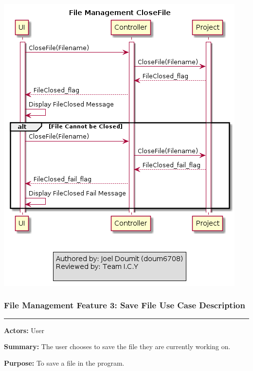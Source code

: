 \documentclass[twoside,letterpaper]{article}
\begin{document}
\includegraphics[width=\textwidth]{images/SequenceDiagrams/FM_FileClose_Image}

\newpage

\subsubsection[File Management Feature 3: Save File Use Case Description]{\rmfamily\bfseries\color{black}
	File Management Feature 3: Save File Use Case Description}
\hypertarget{RefHeading22059017292}{}

\vspace{2pt}
\hrule
\vspace{8pt}
\textbf{Actors:} User \newline

\noindent\textbf{Summary:} The user chooses to save the file they are currently working on. \newline

\noindent\textbf{Purpose:} To save a file in the program. \newline
\end{document}
